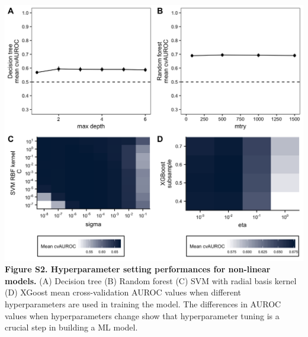 \documentclass[11pt,]{article}
\begin{document}
\includegraphics{Figure_S2.png} \textbf{Figure S2. Hyperparameter
setting performances for non-linear models.} (A) Decision tree (B)
Random forest (C) SVM with radial basis kernel (D) XGoost mean
cross-validation AUROC values when different hyperparameters are used in
training the model. The differences in AUROC values when hyperparameters
change show that hyperparameter tuning is a crucial step in building a
ML model. \newpage
\end{document}

